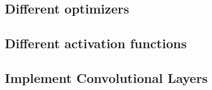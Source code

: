 \subsection{Different optimizers}

\subsection{Different activation functions}

\subsection{Implement Convolutional Layers}
